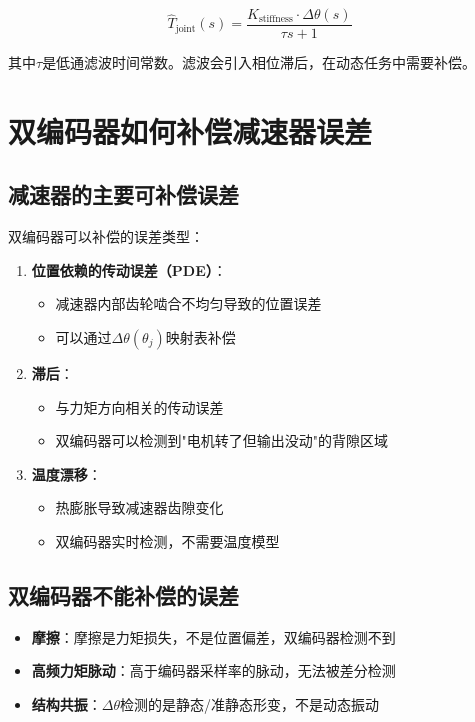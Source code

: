 \begin{equation}
\hat{T}_{\text{joint}}(s) = \frac{K_{\text{stiffness}} \cdot \Delta\theta(s)}{\tau s + 1}
\end{equation}

其中$\tau$是低通滤波时间常数。滤波会引入相位滞后，在动态任务中需要补偿。

\section{双编码器如何补偿减速器误差}

\subsection{减速器的主要可补偿误差}

双编码器可以补偿的误差类型：

\begin{enumerate}
  \item \textbf{位置依赖的传动误差（PDE）}：
  \begin{itemize}
    \item 减速器内部齿轮啮合不均匀导致的位置误差
    \item 可以通过$\Delta\theta(\theta_j)$映射表补偿
  \end{itemize}
  \item \textbf{滞后}：
  \begin{itemize}
    \item 与力矩方向相关的传动误差
    \item 双编码器可以检测到"电机转了但输出没动"的背隙区域
  \end{itemize}
  \item \textbf{温度漂移}：
  \begin{itemize}
    \item 热膨胀导致减速器齿隙变化
    \item 双编码器实时检测，不需要温度模型
  \end{itemize}
\end{enumerate}

\subsection{双编码器不能补偿的误差}

\begin{itemize}
  \item \textbf{摩擦}：摩擦是力矩损失，不是位置偏差，双编码器检测不到
  \item \textbf{高频力矩脉动}：高于编码器采样率的脉动，无法被差分检测
  \item \textbf{结构共振}：$\Delta\theta$检测的是静态/准静态形变，不是动态振动
\end{itemize}

